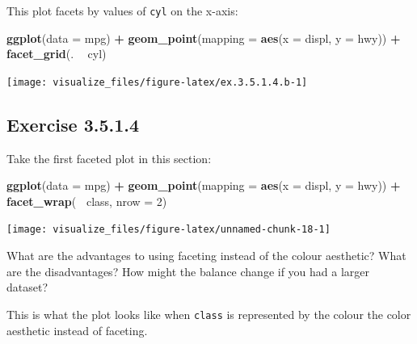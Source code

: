 \documentclass[]{book}
\newenvironment{Shaded}{\begin{snugshade}}{\end{snugshade}}
\newcommand{\DataTypeTok}[1]{\textcolor[rgb]{0.13,0.29,0.53}{#1}}
\newcommand{\DecValTok}[1]{\textcolor[rgb]{0.00,0.00,0.81}{#1}}
\newcommand{\KeywordTok}[1]{\textcolor[rgb]{0.13,0.29,0.53}{\textbf{#1}}}
\newcommand{\NormalTok}[1]{#1}
\newcommand{\OperatorTok}[1]{\textcolor[rgb]{0.81,0.36,0.00}{\textbf{#1}}}
\newcommand{\StringTok}[1]{\textcolor[rgb]{0.31,0.60,0.02}{#1}}
\theoremstyle{plain}
\theoremstyle{remark}
\begin{document}
This plot facets by values of \texttt{cyl} on the x-axis:

\begin{Shaded}
\begin{Highlighting}[]
\KeywordTok{ggplot}\NormalTok{(}\DataTypeTok{data =}\NormalTok{ mpg) }\OperatorTok{+}
\StringTok{  }\KeywordTok{geom_point}\NormalTok{(}\DataTypeTok{mapping =} \KeywordTok{aes}\NormalTok{(}\DataTypeTok{x =}\NormalTok{ displ, }\DataTypeTok{y =}\NormalTok{ hwy)) }\OperatorTok{+}
\StringTok{  }\KeywordTok{facet_grid}\NormalTok{(. }\OperatorTok{~}\StringTok{ }\NormalTok{cyl)}
\end{Highlighting}
\end{Shaded}

\begin{center}\texttt{[image: visualize\_files/figure-latex/ex.3.5.1.4.b-1]} \end{center}

\hypertarget{exercise-3.5.1.4}{%
\subsection*{\texorpdfstring{Exercise {3.5.1.4}}{Exercise 3.5.1.4}}\label{exercise-3.5.1.4}}

Take the first faceted plot in this section:

\begin{Shaded}
\begin{Highlighting}[]
\KeywordTok{ggplot}\NormalTok{(}\DataTypeTok{data =}\NormalTok{ mpg) }\OperatorTok{+}
\StringTok{  }\KeywordTok{geom_point}\NormalTok{(}\DataTypeTok{mapping =} \KeywordTok{aes}\NormalTok{(}\DataTypeTok{x =}\NormalTok{ displ, }\DataTypeTok{y =}\NormalTok{ hwy)) }\OperatorTok{+}
\StringTok{  }\KeywordTok{facet_wrap}\NormalTok{(}\OperatorTok{~}\StringTok{ }\NormalTok{class, }\DataTypeTok{nrow =} \DecValTok{2}\NormalTok{)}
\end{Highlighting}
\end{Shaded}

\begin{center}\texttt{[image: visualize\_files/figure-latex/unnamed-chunk-18-1]} \end{center}

What are the advantages to using faceting instead of the colour aesthetic?
What are the disadvantages?
How might the balance change if you had a larger dataset?

This is what the plot looks like when \texttt{class} is represented by the colour
the color aesthetic instead of faceting.
\end{document}
